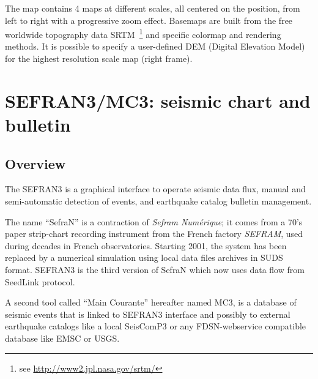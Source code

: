 The map contains 4 maps at different scales, all centered on the  position, from left to right with a progressive zoom effect. Basemaps are built from the free worldwide topography data SRTM~\footnote{see \url{http://www2.jpl.nasa.gov/srtm/}} and specific colormap and rendering methods. It is possible to specify a user-defined DEM (Digital Elevation Model) for the highest resolution scale map (right frame).





\section{SEFRAN3/MC3: seismic chart and bulletin}

\subsection{Overview}

The SEFRAN3 is a graphical interface to operate seismic data flux, manual and semi-automatic detection of events, and earthquake catalog bulletin management.

The name ``SefraN'' is a contraction of \textit{Sefram Numérique}; it comes from a 70's paper strip-chart recording instrument from the French factory \textit{SEFRAM\textregistered}, used during decades in French observatories. Starting 2001, the system has been replaced by a numerical simulation using local data files archives in SUDS format. SEFRAN3 is the third version of SefraN which now uses data flow from SeedLink protocol.

A second tool called ``Main Courante'' hereafter named MC3, is a database of seismic events that is linked to SEFRAN3 interface and possibly to external earthquake catalogs like a local SeisComP3 or any FDSN-webservice compatible database like EMSC or USGS.

